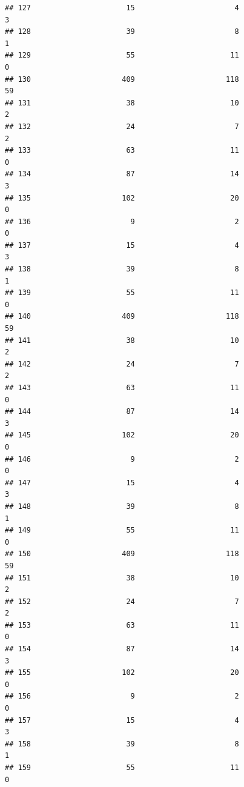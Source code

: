 \documentclass[
]{article}
\begin{document}
\begin{verbatim}
## 127                      15                       4                        3
## 128                      39                       8                        1
## 129                      55                      11                        0
## 130                     409                     118                       59
## 131                      38                      10                        2
## 132                      24                       7                        2
## 133                      63                      11                        0
## 134                      87                      14                        3
## 135                     102                      20                        0
## 136                       9                       2                        0
## 137                      15                       4                        3
## 138                      39                       8                        1
## 139                      55                      11                        0
## 140                     409                     118                       59
## 141                      38                      10                        2
## 142                      24                       7                        2
## 143                      63                      11                        0
## 144                      87                      14                        3
## 145                     102                      20                        0
## 146                       9                       2                        0
## 147                      15                       4                        3
## 148                      39                       8                        1
## 149                      55                      11                        0
## 150                     409                     118                       59
## 151                      38                      10                        2
## 152                      24                       7                        2
## 153                      63                      11                        0
## 154                      87                      14                        3
## 155                     102                      20                        0
## 156                       9                       2                        0
## 157                      15                       4                        3
## 158                      39                       8                        1
## 159                      55                      11                        0

\end{verbatim}
\end{document}
